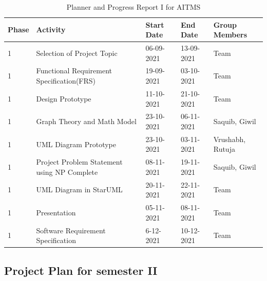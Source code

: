 \documentclass[openany,12pt]{report}
\begin{document}
	\newpage
	\begin{table} [htb]
		\centering
		\begin{tabular}{| p{1.2 cm}| p{5 cm}| p{2.5 cm}| p{2.5 cm}| p{3 cm}| }\hline
			\textbf{Phase}	&\textbf{Activity}	&\textbf{Start Date}	&\textbf{End Date} &\textbf{Group Members}\\\hline\hline
			1 &Selection of Project Topic	&06-09-2021 	&13-09-2021 &Team \\\hline
			1 &Functional Requirement Specification(FRS) &19-09-2021 &03-10-2021 &Team\\\hline
			1 &Design Prototype &11-10-2021 &21-10-2021 &Team\\\hline
			1 &Graph Theory and Math Model &23-10-2021 &06-11-2021 & Saquib, Giwil\\\hline
			1 &UML Diagram Prototype &23-10-2021 &03-11-2021 &Vrushabh, \newline Rutuja \\\hline
			1 &Project Problem Statement using NP Complete &08-11-2021 &19-11-2021 &Saquib, Giwil\\\hline
			1 &UML Diagram in StarUML &20-11-2021 &22-11-2021 &Team \\\hline
			1 &Presentation &05-11-2021 &08-11-2021 &Team \\\hline
			1 &Software Requirement Specification &6-12-2021 &10-12-2021 &Team \\\hline
		\end{tabular}
		\caption{Planner and Progress Report I for AITMS}
		\label{tab:nnwork}
	\end{table}

	\subsection{Project Plan for semester II}
	
\end{document}
